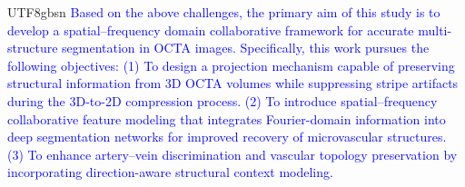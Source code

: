 \documentclass[times, review, 10pt]{elsarticle}
\begin{document}
\begin{CJK}{UTF8}{gbsn}
\textcolor{blue}{Based on the above challenges, the primary aim of this study is to develop a spatial–frequency domain collaborative framework for accurate multi-structure segmentation in OCTA images. Specifically, this work pursues the following objectives: (1) To design a projection mechanism capable of preserving structural information from 3D OCTA volumes while suppressing stripe artifacts during the 3D-to-2D compression process. (2) To introduce spatial–frequency collaborative feature modeling that integrates Fourier-domain information into deep segmentation networks for improved recovery of microvascular structures. (3) To enhance artery–vein discrimination and vascular topology preservation by incorporating direction-aware structural context modeling.}


\end{CJK}
\end{document}
